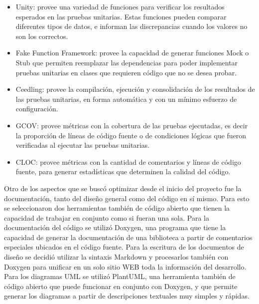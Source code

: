 \begin{itemize}
	\item Unity: provee una variedad de funciones para verificar los resultados esperados en las pruebas unitarias. Estas funciones pueden comparar diferentes tipos de datos, e informan las discrepancias cuando los valores no son los correctos\cite{noauthor_throwtheswitchunity_2020}.

	\item Fake Function Framework: provee la capacidad de generar funciones Mock o Stub que permiten reemplazar las dependencias para poder implementar pruebas unitarias en clases que requieren código que no se desea probar\cite{long_meekrosoftfff_2020}\cite{noauthor_electronvectorfake_function_framework_2020}.
	
	\item Ceedling: provee la compilación, ejecución y consolidación de los resultados de las pruebas unitarias, en forma automática y con un mínimo esfuerzo de configuración\cite{noauthor_throwtheswitchceedling_2020}.
	
	\item GCOV: provee métricas con la cobertura de las pruebas ejecutadas, es decir la proporción de líneas de código fuente o de condiciones lógicas que fueron verificadas al ejecutar las pruebas unitarias\cite{noauthor_gcov_2019}.
	
	\item CLOC: provee métricas con la cantidad de comentarios y líneas de código fuente, para generar estadísticas que determinen la calidad del código\cite{aldanial_aldanialcloc_2020}.  
\end{itemize}

Otro de los aspectos que se buscó optimizar desde el inicio del proyecto fue la documentación, tanto del diseño general como del código en sí mismo. Para esto se seleccionaron dos herramientas también de código abierto que tienen la capacidad de trabajar en conjunto como si fueran una sola. Para la documentación del código se utilizó Doxygen\cite{noauthor_doxygen_nodate}, una programa que tiene la capacidad de generar la documentación de una biblioteca a partir de comentarios especiales ubicados en el código fuente. Para la escritura de los documentos de diseño se decidió utilizar la sintaxis Markdown\cite{noauthor_markdown_2020} y procesarlos también con Doxygen para unificar en un solo sitio WEB toda la información del desarrollo. Para los diagramas UML se utilizó PlantUML\cite{noauthor_herramienta_nodate}, una herramienta también de código abierto que puede funcionar en conjunto con Doxygen, y que permite generar los diagramas a partir de descripciones textuales muy simples y rápidas.

